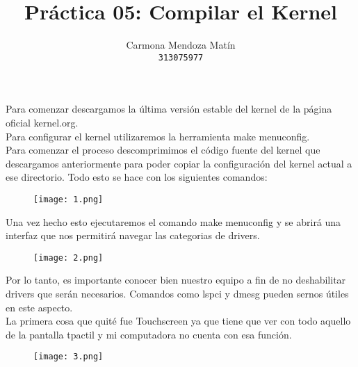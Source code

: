 \documentclass[11pt, a4paper]{report}
\begin{document}
\title{Práctica 05: Compilar el Kernel}
\author{
  Carmona Mendoza Mat\'in\\
  \texttt{313075977}
}
\date{}
\maketitle

Para comenzar descargamos la última versión estable del kernel de la
página oficial kernel.org. \\

Para configurar el kernel utilizaremos la herramienta make menuconfig. \\

Para comenzar el proceso descomprimimos el código fuente del kernel que
descargamos anteriormente para poder copiar la configuración del kernel
actual a ese directorio. Todo esto se hace con los siguientes comandos: \\

  \begin{figure}[!ht] 
    \begin{center}  
      \texttt{[image: 1.png]} 
      \caption{} 
    \end{center} 
  \end{figure} 

  Una vez hecho esto ejecutaremos el comando make menuconfig y se abrirá
  una interfaz que nos permitirá navegar las categorias de drivers. \\

    \begin{figure}[!ht] 
    \begin{center}  
      \texttt{[image: 2.png]} 
      \caption{} 
    \end{center} 
  \end{figure} 

    Por lo tanto, es importante conocer bien nuestro equipo a fin de no
    deshabilitar drivers que serán necesarios. Comandos como lspci y
    dmesg pueden sernos útiles en este aspecto. \\

    La primera cosa que quité fue Touchscreen ya que tiene que ver con
    todo aquello de la pantalla tpactil y mi computadora no cuenta con esa
    función. \\

    \begin{figure}[!ht] 
      \begin{center}  
        \texttt{[image: 3.png]} 
        \caption{} 
      \end{center} 
    \end{figure}
    
\end{document}
